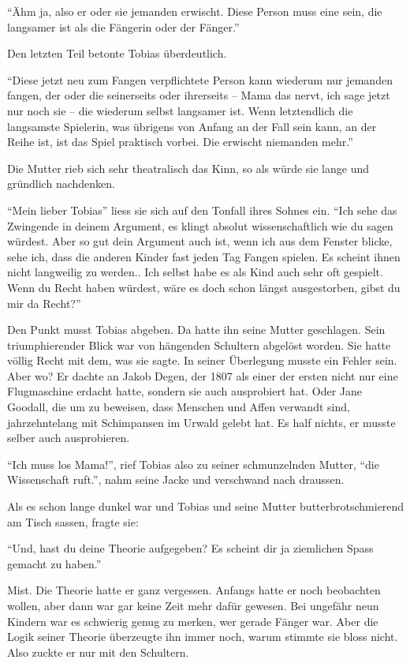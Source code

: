 \enquote{Ähm ja, also er oder sie jemanden erwischt. Diese Person muss eine sein, die langsamer ist als die Fängerin oder der Fänger.}

Den letzten Teil betonte Tobias überdeutlich.

\enquote{Diese jetzt neu zum Fangen verpflichtete Person kann wiederum nur jemanden fangen, der oder die seinerseits oder ihrerseits – Mama das nervt, ich sage jetzt nur noch sie – die wiederum selbst langsamer ist. Wenn letztendlich die langsamste Spielerin, was übrigens von Anfang an der Fall sein kann, an der Reihe ist, ist das Spiel praktisch vorbei. Die erwischt niemanden mehr.}

Die Mutter rieb sich sehr theatralisch das Kinn, so als würde sie lange und gründlich nachdenken.

\enquote{Mein lieber Tobias} liess sie sich auf den Tonfall ihres Sohnes ein. \enquote{Ich sehe das Zwingende in deinem Argument, es klingt absolut wissenschaftlich wie du sagen würdest. Aber so gut dein Argument auch ist, wenn ich aus dem Fenster blicke, sehe ich, dass die anderen Kinder fast jeden Tag Fangen spielen. Es scheint ihnen nicht langweilig zu werden.. Ich selbst habe es als Kind auch sehr oft gespielt. Wenn du Recht haben würdest, wäre es doch schon längst ausgestorben, gibst du mir da Recht?}

Den Punkt musst Tobias abgeben. Da hatte ihn seine Mutter geschlagen. Sein triumphierender Blick war von hängenden Schultern abgelöst worden. Sie hatte völlig Recht mit dem, was sie sagte. In seiner Überlegung musste ein Fehler sein. Aber wo? Er dachte an Jakob Degen, der 1807 als einer der ersten nicht nur eine Flugmaschine erdacht hatte, sondern sie auch ausprobiert hat. Oder Jane Goodall, die um zu beweisen, dass Menschen und Affen verwandt sind, jahrzehntelang mit Schimpansen im Urwald gelebt hat. Es half nichts, er musste selber auch ausprobieren.

\enquote{Ich muss los Mama!}, rief Tobias also zu seiner schmunzelnden Mutter, \enquote{die Wissenschaft ruft.}, nahm seine Jacke und verschwand nach draussen.

Als es schon lange dunkel war und Tobias und seine Mutter butterbrotschmierend am Tisch sassen, fragte sie:

\enquote{Und, hast du deine Theorie aufgegeben? Es scheint dir ja ziemlichen Spass gemacht zu haben.}

Mist. Die Theorie hatte er ganz vergessen. Anfangs hatte er noch beobachten wollen, aber dann war gar keine Zeit mehr dafür gewesen. Bei ungefähr neun Kindern war es schwierig genug zu merken, wer gerade Fänger war. Aber die Logik seiner Theorie überzeugte ihn immer noch, warum stimmte sie bloss nicht. Also zuckte er nur mit den Schultern.

